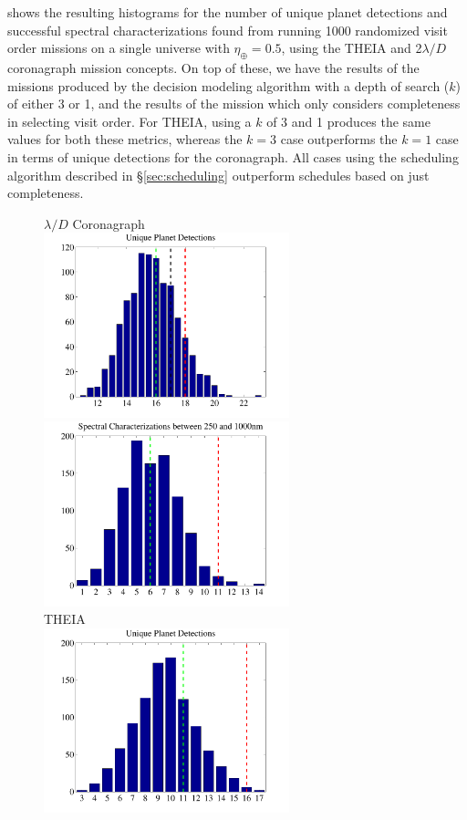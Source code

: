  shows the resulting histograms for the number of unique planet detections and successful spectral characterizations found from running 1000 randomized visit order missions on a single universe with $\eta_\oplus = 0.5$, using the THEIA and 2$\lambda/D$ coronagraph mission concepts.  On top of these, we have the results of the missions produced by the decision modeling algorithm with a depth of search ($k$) of either 3 or 1, and the results of the mission which only considers completeness in selecting visit order.  
For THEIA, using a $k$ of 3 and 1 produces the same values for both these metrics, whereas the $k=3$ case outperforms the $k=1$ case in terms of unique detections for the coronagraph. All cases using the scheduling algorithm described in \S\ref{sec:scheduling} outperform schedules based on just completeness.
\begin{figure}[ht!]
 $\lambda/D$ Coronagraph\\
 \includegraphics[width = 2.8in,clip=true,trim=0.4in 0in 0.5in 0in]{./figures/optimhistsa}
 \includegraphics[width = 2.8in,clip=true,trim=0.4in 0in 0.5in 0in]{./figures/optimhistsb}\\
 THEIA\\
  \includegraphics[width = 2.8in,clip=true,trim=0.4in 0in 0.5in 0in]{./figures/optimhistsc}

\end{figure}
